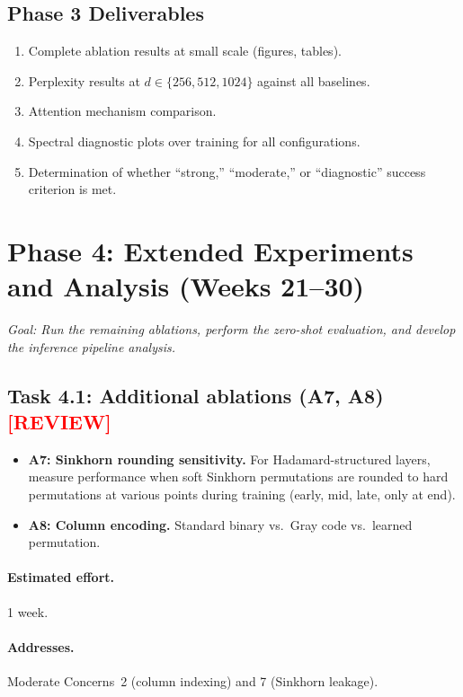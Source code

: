 \documentclass[12pt,a4paper]{article}
\newcommand{\review}{\texorpdfstring{\textcolor{red}{\textbf{[REVIEW]}}}{[REVIEW]}}
\begin{document}
\subsection{Phase 3 Deliverables}

\begin{enumerate}
    \item Complete ablation results at small scale (figures, tables).
    \item Perplexity results at $d \in \{256, 512, 1024\}$ against all baselines.
    \item Attention mechanism comparison.
    \item Spectral diagnostic plots over training for all configurations.
    \item Determination of whether ``strong,'' ``moderate,'' or ``diagnostic'' success criterion is met.
\end{enumerate}


\section{Phase 4: Extended Experiments and Analysis (Weeks 21--30)}\label{sec:phase4}

\textit{Goal: Run the remaining ablations, perform the zero-shot evaluation, and develop the inference pipeline analysis.}

\subsection{Task 4.1: Additional ablations (A7, A8) \review}

\begin{itemize}
    \item \textbf{A7: Sinkhorn rounding sensitivity.} For Hadamard-structured layers, measure performance when soft Sinkhorn permutations are rounded to hard permutations at various points during training (early, mid, late, only at end).
    \item \textbf{A8: Column encoding.} Standard binary vs.\ Gray code vs.\ learned permutation.
\end{itemize}

\paragraph{Estimated effort.} 1 week.

\paragraph{Addresses.} Moderate Concerns~2 (column indexing) and 7 (Sinkhorn leakage).
\end{document}
